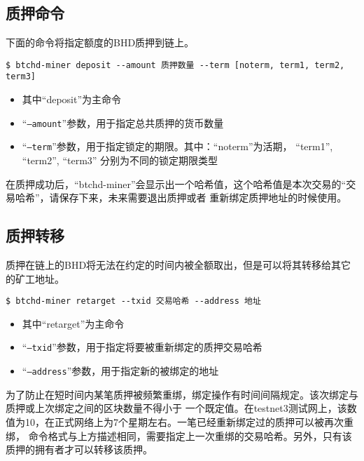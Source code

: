 \subsection{质押命令}
\begin{flushleft}
    下面的命令将指定额度的BHD质押到链上。
\end{flushleft}
\scriptsize
\begin{verbatim}
$ btchd-miner deposit --amount 质押数量 --term [noterm, term1, term2, term3]
\end{verbatim}
\normalsize
\begin{itemize}
    \item 其中``deposit''为主命令
    \item ``\texttt{--amount}''参数，用于指定总共质押的货币数量
    \item ``\texttt{--term}''参数，用于指定锁定的期限。其中：``noterm''为活期， ``term1'', ``term2'', ``term3''
        分别为不同的锁定期限类型
\end{itemize}
\begin{flushleft}
    在质押成功后，``btchd-miner''会显示出一个哈希值，这个哈希值是本次交易的``交易哈希''，请保存下来，未来需要退出质押或者
    重新绑定质押地址的时候使用。
\end{flushleft}
\subsection{质押转移}
\begin{flushleft}
    质押在链上的BHD将无法在约定的时间内被全额取出，但是可以将其转移给其它的矿工地址。
\end{flushleft}
\scriptsize
\begin{verbatim}
$ btchd-miner retarget --txid 交易哈希 --address 地址
\end{verbatim}
\normalsize
\begin{itemize}
    \item 其中``retarget''为主命令
    \item ``\texttt{--txid}''参数，用于指定将要被重新绑定的质押交易哈希
    \item ``\texttt{--address}''参数，用于指定新的被绑定的地址
\end{itemize}
\begin{flushleft}
    为了防止在短时间内某笔质押被频繁重绑，绑定操作有时间间隔规定。该次绑定与质押或上次绑定之间的区块数量不得小于
    一个既定值。在testnet3测试网上，该数值为10，在正式网络上为7个星期左右。一笔已经重新绑定过的质押可以被再次重绑，
    命令格式与上方描述相同，需要指定上一次重绑的交易哈希。另外，只有该质押的拥有者才可以转移该质押。
\end{flushleft}

